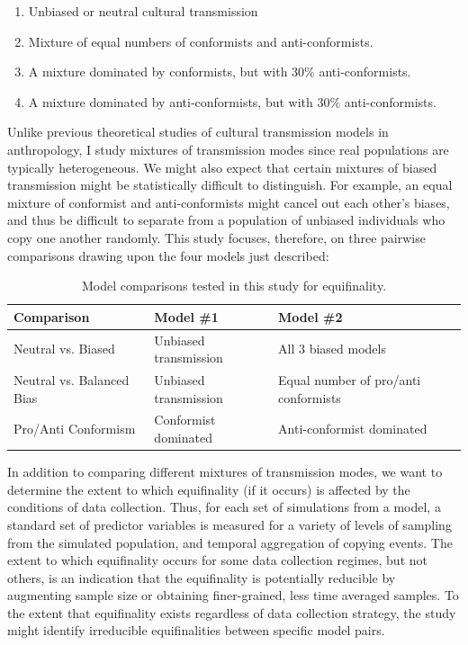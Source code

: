 \documentclass[10pt,letterpaper]{article}
\begin{document}
\begin{enumerate}
\def\labelenumi{\arabic{enumi}.}
\itemsep1pt\parskip0pt
\item
  Unbiased or neutral cultural transmission
\item
  Mixture of equal numbers of conformists and anti-conformists.
\item
  A mixture dominated by conformists, but with 30\% anti-conformists.
\item
  A mixture dominated by anti-conformists, but with 30\%
  anti-conformists.
\end{enumerate}

Unlike previous theoretical studies of cultural transmission models in anthropology, I study mixtures of transmission modes since real populations are typically heterogeneous.  We might also expect that certain mixtures of biased transmission might be statistically difficult to distinguish.  For example, an equal mixture of conformist and anti-conformists might cancel out each other's biases, and thus be difficult to separate from a population of unbiased individuals who copy one another randomly. This study focuses, therefore, on three pairwise comparisons drawing upon the four models just described:

\begin{table}[h]
\begin{tabular}{lll}
\hline
Comparison & Model \#1 & Model \#2 \\ 
\hline
Neutral vs. Biased & Unbiased transmission & All 3 biased models \\
Neutral vs. Balanced Bias & Unbiased transmission & Equal number of pro/anti conformists \\
Pro/Anti Conformism & Conformist dominated & Anti-conformist dominated  \\
\hline
\end{tabular}

\caption{Model comparisons tested in this study for equifinality.}
\label{tab:comparisons}
\end{table}

In addition to comparing different mixtures of transmission modes, we want to determine the extent to which equifinality (if it occurs) is affected by the conditions of data collection.  Thus, for each set of simulations from a model, a standard set of predictor variables is measured for a variety of levels of sampling from the simulated population, and temporal aggregation of copying events.  The extent to which equifinality occurs for some data collection regimes, but not others, is an indication that the equifinality is potentially reducible by augmenting sample size or obtaining finer-grained, less time averaged samples. To the extent that equifinality exists regardless of data collection strategy, the study might identify irreducible equifinalities between specific model pairs.  
\end{document}
